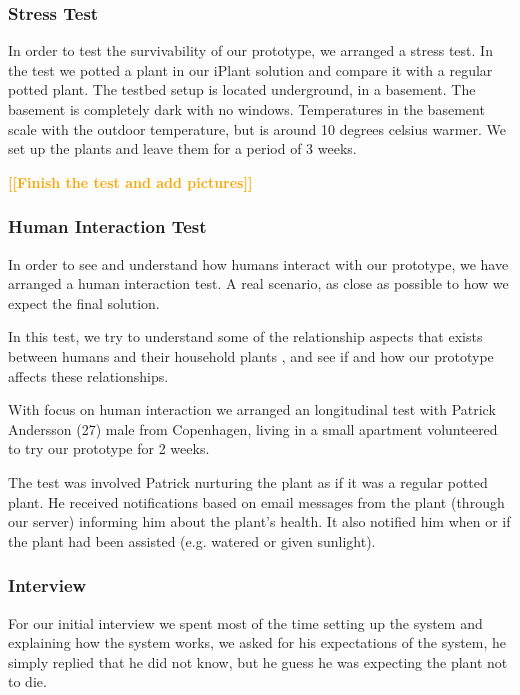\documentclass{ubicomp2012}
\newcommand{\todo}[1]{\textsf{\textbf{\textcolor{Orange}{[[#1]]}}}}
\begin{document}
\subsubsection{Stress Test}
In order to test the survivability of our prototype, we arranged a stress test. In the test we potted a plant in our iPlant solution and compare it with a regular potted plant. 
The testbed setup is located underground, in a basement. The basement is completely dark with no windows. Temperatures in the basement scale with the outdoor temperature, but is around 10 degrees celsius warmer. We set up the plants and leave them for a period of 3 weeks.

\todo{Finish the test and add pictures}

\subsubsection{Human Interaction Test}

In order to see and understand how humans interact with our prototype, we have arranged a human interaction test. A real scenario, as close as possible to how we expect the final solution.

In this test, we try to understand some of the relationship aspects that exists between humans and their household plants \cite{People-Plant-Relationship}, and see if and how our prototype affects these relationships.

With focus on human interaction we arranged an longitudinal test with Patrick Andersson (27) male from Copenhagen, living in a small apartment volunteered to try our prototype for 2 weeks.

The test was involved Patrick nurturing the plant as if it was a regular potted plant. He received notifications based on email messages from the plant (through our server) informing him about the plant’s health. It also notified him when or if the plant had been assisted (e.g. watered or given sunlight).

\subsubsection{Interview}
For our initial interview we spent most of the time setting up the system and explaining how the system works, we asked for his expectations of the system, he simply replied that he did not know, but he guess he was expecting the plant not to die.
\end{document}
